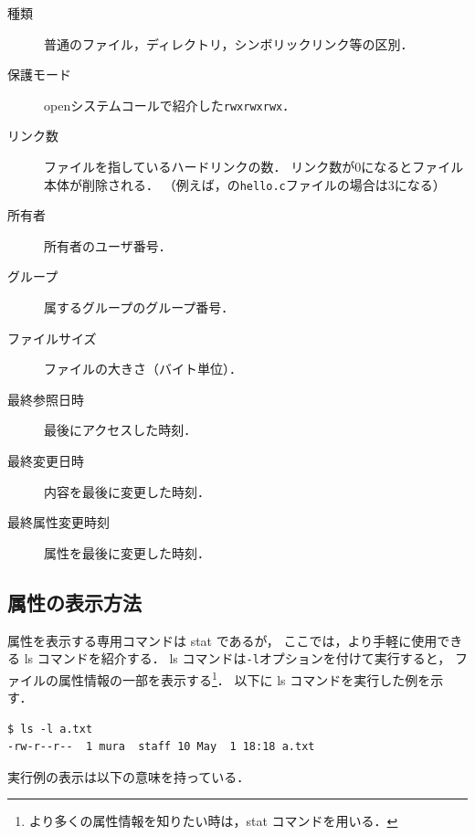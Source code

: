 \begin{description}
\item[種類] 普通のファイル，ディレクトリ，シンボリックリンク等の区別．
\item[保護モード] openシステムコールで紹介した\texttt{rwxrwxrwx}．
\item[リンク数] ファイルを指しているハードリンクの数．
リンク数が0になるとファイル本体が削除される．
（例えば，の\texttt{hello.c}ファイルの場合は3になる）
\item[所有者] 所有者のユーザ番号．
\item[グループ] 属するグループのグループ番号．
\item[ファイルサイズ] ファイルの大きさ（バイト単位）．
\item[最終参照日時] 最後にアクセスした時刻．
\item[最終変更日時] 内容を最後に変更した時刻．
\item[最終属性変更時刻] 属性を最後に変更した時刻．
\end{description}

\subsection{属性の表示方法}
属性を表示する専用コマンドは stat であるが，
ここでは，より手軽に使用できる ls コマンドを紹介する．
ls コマンドは\texttt{-l}オプションを付けて実行すると，
ファイルの属性情報の一部を表示する\footnote{
より多くの属性情報を知りたい時は，stat コマンドを用いる．}．
以下に ls コマンドを実行した例を示す．

\begin{lstlisting}[numbers=none]
$ ls -l a.txt
-rw-r--r--  1 mura  staff 10 May  1 18:18 a.txt
\end{lstlisting}

実行例の表示は以下の意味を持っている．

